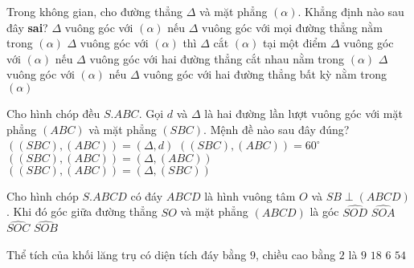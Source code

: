 \begin{ex}%
Trong không gian, cho đường thẳng $\Delta$ và mặt phẳng $(\alpha)$. Khẳng định nào sau đây {\bf sai}?
\choice
{$\Delta$ vuông góc với $(\alpha)$ nếu $\Delta$ vuông góc với mọi đường thẳng nằm trong $(\alpha)$}
{$\Delta$ vuông góc với $(\alpha)$ thì $\Delta$ cắt $(\alpha)$ tại một điểm}
{$\Delta$ vuông góc với $(\alpha)$ nếu $\Delta$ vuông góc với hai đường thẳng cắt nhau nằm trong $(\alpha)$}
{\True $\Delta$ vuông góc với $(\alpha)$ nếu $\Delta$ vuông góc với hai đường thẳng bất kỳ nằm trong $(\alpha)$}
\end{ex}

\begin{ex}%
	Cho hình chóp đều $S.ABC$. Gọi $d$ và $\Delta$ là hai đường lần lượt vuông góc với mặt phẳng $\left(ABC\right)$ và mặt phẳng $\left(SBC\right)$. Mệnh đề nào sau đây đúng?
	\choice
	{\True $\left(\left(SBC\right),\left(ABC\right)\right)=\left(\Delta, d\right)$}
	{$\left(\left(SBC\right),\left(ABC\right)\right)=60^\circ$}
	{$\left(\left(SBC\right),\left(ABC\right)\right)=\left(\Delta, \left(ABC\right)\right)$}
	{$\left(\left(SBC\right),\left(ABC\right)\right)=\left(\Delta, \left(SBC\right)\right)$}
	\end{ex}

\begin{ex}%
Cho hình chóp $S.ABCD$ có đáy $ABCD$ là hình vuông tâm $O$ và $SB \perp (ABCD)$. Khi đó góc giữa đường thẳng $SO$ và mặt phẳng $(ABCD)$ là góc
\choice
{$\widehat{SOD}$}
{$\widehat{SOA}$}
{$\widehat{SOC}$}
{\True $\widehat{SOB}$}
\end{ex}

\begin{ex}%
Thể tích của khối lăng trụ có diện tích đáy bằng $9$, chiều cao bằng $2$ là
\choice
{$9$}
{\True $18$}
{$6$}
{$54$}
\end{ex}

